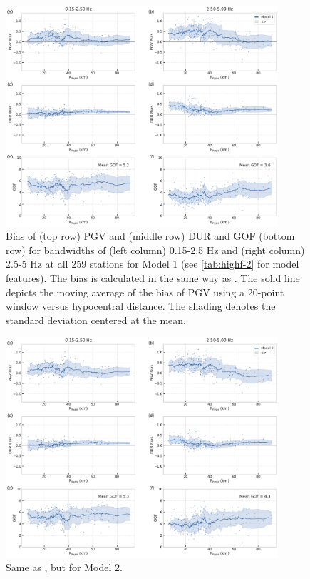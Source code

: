 

\begin{figure}[!ht]
  \centering
  \includegraphics[width=0.9\textwidth,height=0.9\textheight,keepaspectratio]{figures/figure_highf_S11.pdf}
  \caption{Bias of (top row) PGV and (middle row) DUR and GOF (bottom row) for bandwidths of (left column) 0.15-2.5 Hz and (right column) 2.5-5 Hz at all 259 stations for Model 1 (see \cref{tab:highf-2} for model features). The bias is calculated in the same way as . The solid line depicts the moving average of the bias of PGV using a 20-point window versus hypocentral distance. The shading denotes the standard deviation centered at the mean.
  }
  \label{fig:highf-A11}
\end{figure}
\clearpage

\begin{figure}[!ht]
  \centering
  \includegraphics[width=0.9\textwidth,height=0.9\textheight,keepaspectratio]{figures/figure_highf_S12.pdf}
  \caption{Same as , but for Model 2.
  }
\label{fig:highf-A12}
\end{figure}
\clearpage


